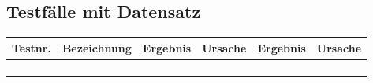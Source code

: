 \begin{landscape}
	\section{Testfälle mit Datensatz}	
		\begin{tabular}{|p{2.0cm} |p{5.0cm}|p{3.0cm}|p{5.0cm}|p{4.0cm}|p{4.0cm}|}
			\hline \textbf{Testnr.} & \textbf{Bezeichnung} & \textbf{Ergebnis} & \textbf{Ursache} & \textbf{Ergebnis} & \textbf{Ursache} \\
			\hline       &          &          &        &         &       \\
			\hline       &          &          &        &         &       \\
			\hline       &          &          &        &         &       \\
			\hline       &          &          &        &         &       \\
			\hline 
		\end{tabular} \ \\
		\ \\
	
\end{landscape}